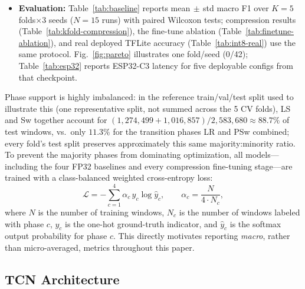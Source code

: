 \documentclass[conference]{IEEEtran}
\begin{document}
\begin{itemize}
        budget, no validation access) to avoid double-dipping on the FP32 validation set; runtime
        assertions verify zero subject overlap for every fold.
  \item \textbf{Evaluation:} Table~\ref{tab:baseline} reports mean$\,\pm$\,std macro F1 over
        $K{=}5$ folds$\times$3 seeds ($N{=}15$ runs) with paired Wilcoxon tests; compression results
        (Table~\ref{tab:kfold-compression}), the fine-tune ablation
        (Table~\ref{tab:finetune-ablation}), and real deployed TFLite accuracy
        (Table~\ref{tab:int8-real}) use the same protocol. Fig.~\ref{fig:pareto} illustrates one
        fold/seed (0/42); Table~\ref{tab:esp32} reports ESP32-C3 latency for five deployable
        configs from that checkpoint.
\end{itemize}

Phase support is highly imbalanced: in the reference train/val/test split used to illustrate this
(one representative split, not summed across the 5 CV folds), LS and Sw together account for
$(1{,}274{,}499+1{,}016{,}857)/2{,}583{,}680 \approx 88.7\%$ of test windows, vs.\ only
$11.3\%$ for the transition phases LR and PSw combined; every fold's test split preserves
approximately this same majority:minority ratio. To prevent the majority phases from
dominating optimization, all models---including the four FP32 baselines and every compression
fine-tuning stage---are trained with a class-balanced weighted cross-entropy loss:
\begin{equation}
  \mathcal{L} = -\sum_{c=1}^{4} \alpha_c \, y_c \log \hat{y}_c,
  \qquad
  \alpha_c = \frac{N}{4 \cdot N_c},
  \label{eq:loss}
\end{equation}
where $N$ is the number of training windows, $N_c$ is the number of windows labeled with phase
$c$, $y_c$ is the one-hot ground-truth indicator, and $\hat{y}_c$ is the softmax output
probability for phase $c$. This directly motivates reporting \emph{macro}, rather than
micro-averaged, metrics throughout this paper.

\subsection{TCN Architecture}
\end{document}
